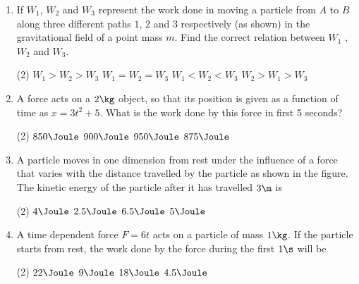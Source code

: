 \documentclass{article}
\begin{document}
\begin{enumerate}
\item If $W_1$, $W_2$ and $W_3$ represent the work done in moving a
particle from $A$ to $B$ along three different paths $1$, $2$ and $3$ respectively (as shown) in the gravitational field of a point mass $m$. Find the correct relation between $W_1$ , $W_2$ and $W_3$.
\begin{center}
\end{center}
\begin{tasks}(2)
	\task $W_1 > W_2 > W_3$
	\task $W_1 = W_2 = W_3$\ans
	\task $W_1 < W_2 < W_3$
	\task $W_2 > W_1 > W_3$
\end{tasks}

\item A force acts on a $2 \kg$ object, so that its position is given as a function of time as $x = 3t^2 + 5$. What is the work done by this force in first 5 seconds?
\begin{tasks}(2)
	\task $850\Joule$ 
	\task $900\Joule$ \ans 
	\task $950\Joule$
	\task $875\Joule$
\end{tasks}

\item A particle moves in one dimension from rest under the influence of a force that varies with the distance travelled by the particle as shown in the figure. The kinetic energy of the particle after it has travelled $3 \m$ is
\begin{center}
\end{center}
\begin{tasks}(2)
	\task $4\Joule$
	\task $2.5\Joule$
	\task $6.5\Joule$\ans
	\task $5\Joule$
\end{tasks}

\item A time dependent force $F = 6t$ acts on a particle of mass
$1 \kg$. If the particle starts from rest, the work done by the force during the first $1 \s$ will be
\begin{tasks}(2)
	\task $22\Joule$
	\task $9\Joule$
	\task $18\Joule$
	\task $4.5\Joule$\ans
\end{tasks}


\end{enumerate}
\end{document}
